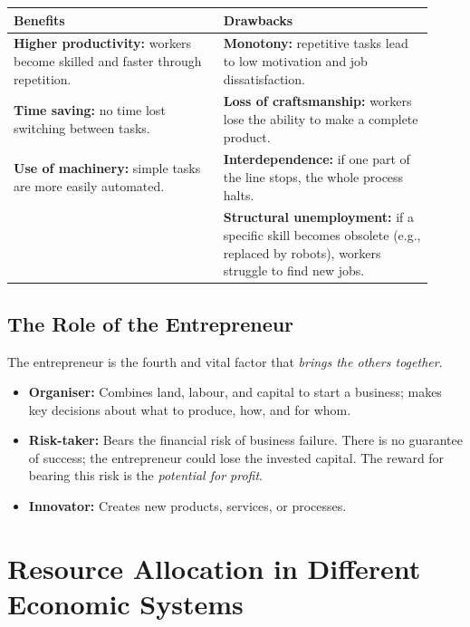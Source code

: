 \documentclass[11pt, a4paper, twoside]{book}
\begin{document}
\begin{tcolorbox}[
  enhanced, colback=LightBlue, colframe=NavyPrimary,
  arc=0pt, boxrule=0.7pt
]
\begin{tabular}{@{}>{\RaggedRight\arraybackslash}p{0.46\linewidth}>{\RaggedRight\arraybackslash}p{0.46\linewidth}@{}}
\textbf{\color{NavyPrimary}Benefits} & \textbf{\color{NavyPrimary}Drawbacks} \\
\midrule
\textbf{Higher productivity:} workers become skilled and faster through repetition. & \textbf{Monotony:} repetitive tasks lead to low motivation and job dissatisfaction. \\
\textbf{Time saving:} no time lost switching between tasks. & \textbf{Loss of craftsmanship:} workers lose the ability to make a complete product. \\
\textbf{Use of machinery:} simple tasks are more easily automated. & \textbf{Interdependence:} if one part of the line stops, the whole process halts. \\
& \textbf{Structural unemployment:} if a specific skill becomes obsolete (e.g., replaced by robots), workers struggle to find new jobs. \\
\end{tabular}
\end{tcolorbox}

\subsection{The Role of the Entrepreneur}

The entrepreneur is the fourth and vital factor that \emph{brings the others together}.

\begin{itemize}
  \item \textbf{Organiser:} Combines land, labour, and capital to start a business; makes key decisions about what to produce, how, and for whom.
  \item \textbf{Risk-taker:} Bears the financial risk of business failure. There is no guarantee of success; the entrepreneur could lose the invested capital. The reward for bearing this risk is the \emph{potential for profit}.
  \item \textbf{Innovator:} Creates new products, services, or processes.
\end{itemize}

\section{Resource Allocation in Different Economic Systems}
\end{document}
